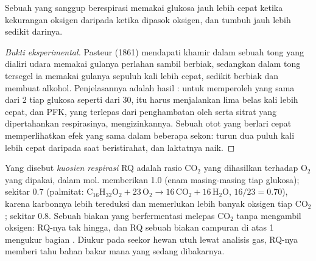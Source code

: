 \begin{proposition}\label{prop:b1:respiration-fermentation:pasteur}
Sebuah  yang sanggup berespirasi memakai glukosa jauh lebih cepat
ketika kekurangan oksigen daripada ketika dipasok oksigen, dan tumbuh
jauh lebih sedikit darinya.
\end{proposition}
\begin{proof}[Bukti eksperimental]
Pasteur (1861) mendapati khamir dalam sebuah tong yang dialiri udara
memakai gulanya perlahan sambil berbiak, sedangkan dalam tong tersegel
ia memakai gulanya sepuluh kali lebih cepat, sedikit berbiak dan
membuat alkohol. Penjelasannya adalah hasil : untuk memperoleh
 yang sama dari 2 tiap glukosa seperti dari 30,  itu harus
menjalankan  lima belas kali lebih cepat, dan PFK, yang
terlepas dari penghambatan oleh  serta sitrat yang dipertahankan
respirasinya, mengizinkannya. Sebuah otot yang berlari cepat
memperlihatkan efek yang sama dalam beberapa sekon:  turun
dua puluh kali lebih cepat daripada saat beristirahat, dan laktatnya
naik.
\end{proof}

\begin{definition}\label{def:b1:respiration-fermentation:rq}
Yang disebut \emph{kuosien respirasi} RQ adalah rasio $\mathrm{CO_2}$
yang dihasilkan terhadap $\mathrm{O_2}$ yang dipakai, dalam mol.
 memberikan 1.0 (enam masing-masing tiap glukosa); 
sekitar 0.7 (palmitat:
$\mathrm{C_{16}H_{32}O_2} + 23\,\mathrm{O_2} \to 16\,\mathrm{CO_2} +
16\,\mathrm{H_2O}$, $16/23 = 0.70$), karena karbonnya lebih tereduksi
dan memerlukan lebih banyak oksigen tiap $\mathrm{CO_2}$; 
sekitar 0.8. Sebuah biakan yang berfermentasi melepas $\mathrm{CO_2}$
tanpa mengambil oksigen: RQ-nya tak hingga, dan RQ sebuah biakan
campuran di atas 1 mengukur bagian . Diukur pada seekor
hewan utuh lewat analisis gas, RQ-nya memberi tahu bahan bakar mana
yang sedang dibakarnya.
\end{definition}

